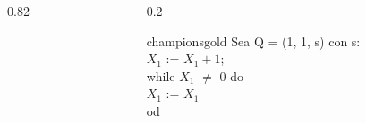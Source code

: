 \documentclass[xcolor=table]{beamer}
\begin{document}
\begin{frame}[fragile]
\begin{columns}
\begin{column}{0.82\textwidth}
    \end{column}


    \begin{column}{0.2\textwidth}
        \begin{colorblock}[black]{championsgold}{}\scriptsize
        Sea Q = (1, 1, s) con s: \\
        \hspace{0.5cm}   $X_1$ := $X_1 + 1$;\\
        \hspace{0.5cm}   while $X_1$ $\neq$ 0 do \\
        \hspace{0.75cm}    $X_1$ := $X_1$\\
        \hspace{0.5cm}  od
        \end{colorblock}
    \end{column}
    
\end{columns}
        
\end{frame}
\end{document}
